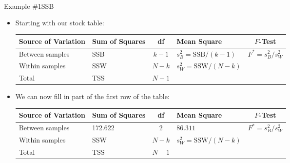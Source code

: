 \documentclass[xcolor=dvipsnames]{beamer}
\begin{document}
\begin{frame}{Example \#1}{SSB}
	\begin{itemize}
		\item Starting with our stock table:
		\vspace{2mm}
		\begin{center}
			{\scriptsize
				\begin{tabular}{lp{1.2cm}cp{2.5cm}c}
					\hline 
					\textbf{Source of Variation} & \textbf{Sum of Squares} & \textbf{df} & \textbf{Mean Square} & $F$-\textbf{Test} \\ \hline 
					Between samples & SSB & $k - 1$ & $s_B^2 = \text{SSB} / (k-1)$ & $F^* = s_B^2 / s_W^2$ \\
					Within samples & SSW & $N - k$ &  $s_W^2 = \text{SSW} / (N-k)$ & \\
					Total & TSS & $N-1$ & & \\ \hline
			\end{tabular}}
		\end{center}
		\vspace{5mm}
		\item We can now fill in part of the first row of the table:
			\vspace{2mm}
		\begin{center}
			{\scriptsize
				\begin{tabular}{lp{1.2cm}cp{2.5cm}c}
					\hline 
					\textbf{Source of Variation} & \textbf{Sum of Squares} & \textbf{df} & \textbf{Mean Square} & $F$-\textbf{Test} \\ \hline 
					Between samples & 172.622 & 2 & $86.311$ & $F^* = s_B^2 / s_W^2$ \\
					Within samples & SSW & $N - k$ &  $s_W^2 = \text{SSW} / (N-k)$ & \\
					Total & TSS & $N-1$ & & \\ \hline
			\end{tabular}}
		\end{center}
	\end{itemize}
\end{frame}
\end{document}
